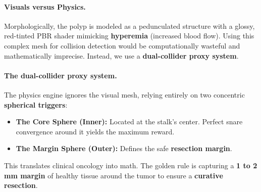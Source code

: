 \paragraph{Visuals versus Physics.}
Morphologically, the polyp is modeled as a pedunculated structure with a glossy, red-tinted PBR shader mimicking \textbf{hyperemia} (increased blood flow). Using this complex mesh for collision detection would be computationally wasteful and mathematically imprecise. Instead, we use a \textbf{dual-collider proxy system}.

\paragraph{The dual-collider proxy system.}
The physics engine ignores the visual mesh, relying entirely on two concentric \textbf{spherical triggers}:
\begin{itemize}
\item \textbf{The Core Sphere (Inner):} Located at the stalk's center. Perfect snare convergence around it yields the maximum reward.
\item \textbf{The Margin Sphere (Outer):} Defines the safe \textbf{resection margin}.
\end{itemize}

This translates clinical oncology into math. The golden rule is capturing a \textbf{1 to 2\,mm margin} of healthy tissue around the tumor to ensure a \textbf{curative resection}. 
